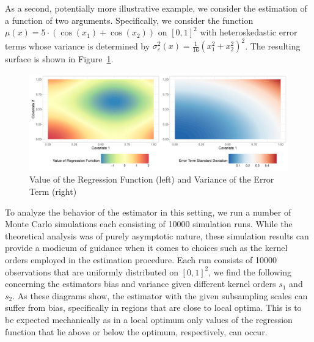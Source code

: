 \newpage
As a second, potentially more illustrative example, we consider the estimation of a function of two arguments.
Specifically, we consider the function $\mu(x) = 5 \cdot \left(\cos(x_1) + \cos(x_2)\right)$ on $[0,1]^2$ with heteroskedastic error terms whose variance is determined by $\sigma_{\varepsilon}^2(x) = \frac{1}{16}\left(x_1^2 + x_2^2\right)^2$.
The resulting surface is shown in Figure~\ref{fig:reg_surface}.
\begin{figure}[H]
	\centering
	\includegraphics[width = \textwidth]{../Graphics/Reg_Exmp1.pdf}
	\caption{Value of the Regression Function (left) and Variance of the Error Term (right)}
	\label{fig:reg_surface}
\end{figure}
To analyze the behavior of the estimator in this setting, we run a number of Monte Carlo simulations each consisting of 10000 simulation runs.
While the theoretical analysis was of purely asymptotic nature, these simulation results can provide a modicum of guidance when it comes to choices such as the kernel orders employed in the estimation procedure.
Each run consists of 10000 observations that are uniformly distributed on $[0,1]^2$, we find the following concerning the estimators bias and variance given different kernel orders $s_1$ and $s_2$.
As these diagrams show, the estimator with the given subsampling scales can suffer from bias, specifically in regions that are close to local optima.
This is to be expected mechanically as in a local optimum only values of the regression function that lie above or below the optimum, respectively, can occur.


